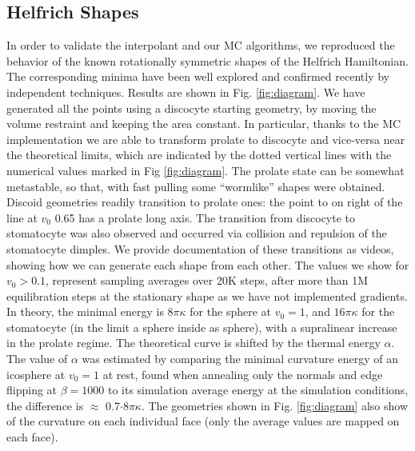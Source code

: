 \documentclass[twocolumn]{biophys-new}
\begin{document}
\subsection*{Helfrich Shapes}
In order to validate the interpolant and our MC algorithms, we reproduced the behavior of the known rotationally symmetric shapes of the Helfrich Hamiltonian. The corresponding minima have been well explored and confirmed recently by independent techniques.\cite{BIAN2020112758,cjmsolver} Results are shown in Fig. \ref{fig:diagram}. We have generated all the points using a discocyte starting geometry, by moving the volume restraint and keeping the area constant. In particular, thanks to the MC implementation we are able to transform prolate to discocyte and vice-versa near the theoretical limits, which are indicated by the dotted vertical lines with the numerical values marked in Fig \ref{fig:diagram}.\cite{BIAN2020112758,cjmsolver} The prolate state can be somewhat metastable, so that, with fast pulling some ``wormlike'' shapes were obtained. Discoid geometries readily transition to prolate ones: the point to on right of the line at $v_0$ 0.65 has a prolate long axis. The transition from discocyte to stomatocyte was also observed and occurred via collision and repulsion of the stomatocyte dimples. We provide documentation of these transitions as videos, showing how we can generate each shape from each other. The values we show for $v_0>0.1$, represent sampling averages over 20K steps, after more than 1M equilibration steps at the stationary shape as we have not implemented gradients. In theory, the minimal energy is $8\pi\kappa$ for the sphere at $v_0 = 1$, and $16\pi\kappa$ for the stomatocyte (in the limit a sphere inside as sphere), with a supralinear increase in the prolate regime.\cite{PhysRevA.44.1182}
The theoretical curve is shifted by the thermal energy $\alpha$. The value of $\alpha$ was estimated by comparing the minimal curvature energy of an icosphere at $v_0 = 1$ at rest, found when annealing only the normals and edge flipping at $\beta=1000$ to its simulation average energy at the simulation conditions, the difference is $\approx$ 0.7$\cdot 8\pi\kappa$. The geometries shown in Fig. \ref{fig:diagram} also show of the curvature on each individual face (only the average values are mapped on each face). 
\end{document}
